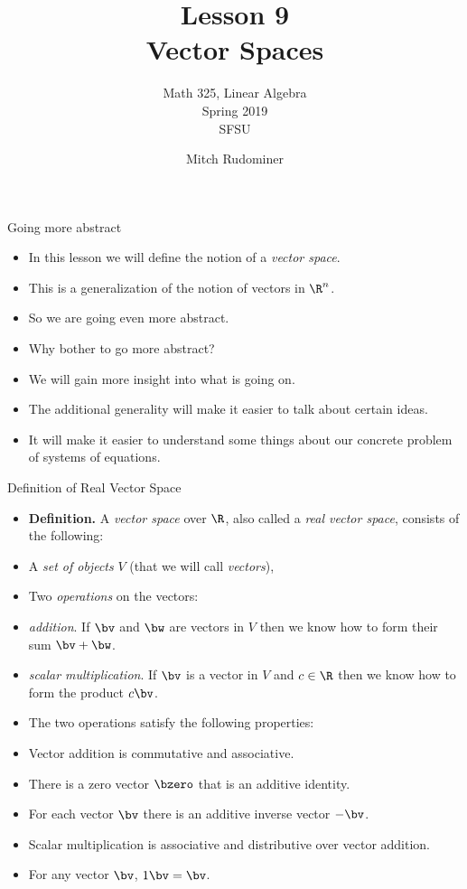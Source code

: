 \documentclass{beamer}
\title{Lesson 9 \\ Vector Spaces}
\subtitle{Math 325, Linear Algebra \\ Spring 2019 \\ SFSU}
\author{Mitch Rudominer}
\date{}
\begin{document}
\begin{frame}
  \titlepage
\end{frame}

\begin{frame}{Going more abstract}

\begin{itemize}
\item In this lesson we will define the notion of a \emph{vector space}.
\item This is a generalization of the notion of vectors in $\R^n$.
\item So we are going even more abstract.
\item Why bother to go more abstract?
\item We will gain more insight into what is going on.
\item The additional generality will make it easier to talk about certain ideas.
\item It will make it easier to understand some things about our concrete
problem of systems of equations.
\end{itemize}
\end{frame}

\begin{frame}{Definition of Real Vector Space}

\begin{itemize}
\item \textbf{Definition.} A \emph{vector space} over $\R$, also called
a \emph{real vector space}, consists of the following:
\item A \emph{set of objects} $V$ (that we will call \emph{vectors}),
\item Two \emph{operations} on the vectors:
\item \emph{addition}. If $\bv$ and $\bw$ are vectors in $V$ then
we know how to form their sum $\bv+\bw$.
\item \emph{scalar multiplication}. If $\bv$ is a vector in $V$ and
$c\in\R$ then we know how to form the product $c\bv$.
\item The two operations satisfy the following properties:
\item Vector addition is commutative and associative.
\item There is a zero vector $\bzero$ that is an additive identity.
\item For each vector $\bv$ there is an additive inverse vector $-\bv$.
\item Scalar multiplication is associative and distributive over vector addition.
\item For any vector $\bv$, $1\bv = \bv$.
\end{itemize}
\end{frame}
\end{document}
